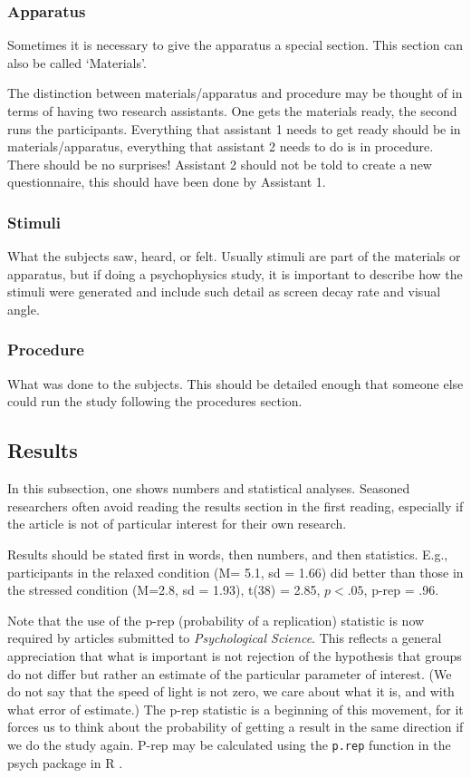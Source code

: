 \documentclass[doc]{apa}%
\let\proglang=\textsf
\newcommand{\R}{\proglang{R}}
\newcommand{\pkg}[1]{{\normalfont\fontseries{b}\selectfont #1}}
\newcommand{\fun}[1]{{\texttt{#1}}}
\begin{document}
\subsubsection{Apparatus}
Sometimes it is necessary to give the apparatus a special section.  This section can also be called `Materials'.

The distinction between materials/apparatus and procedure may be thought of in terms of having two research assistants.  One gets the materials ready, the second runs the participants.  Everything that assistant 1 needs to get ready should be in materials/apparatus, everything that assistant  2 needs to do is in procedure.  There should be no surprises!  Assistant 2 should not be told to create a new questionnaire, this should have been done by Assistant 1. %

\subsubsection{Stimuli}
What the subjects saw, heard, or felt. %
Usually stimuli are part of the materials or apparatus, but if doing a psychophysics study, it is important to describe how the stimuli were generated and include such detail as screen decay rate and visual angle.
\subsubsection{Procedure}
What was done to the subjects.  This should be detailed enough that someone else could run the study following the procedures section. 
\subsection{Results}
In this subsection, one shows numbers and statistical analyses. Seasoned researchers often avoid reading the results section in the first reading, especially if the article is not of particular interest for their own research. %

Results should be stated first in words, then numbers, and then statistics.  E.g., participants in the relaxed condition (M= 5.1, sd = 1.66) did better than those in the stressed condition (M=2.8, sd = 1.93), t(38) = 2.85, $p< .05$, p-rep = .96.



Note that the use of the p-rep (probability of a replication) statistic \cite{killeen} is now required by articles submitted to\emph{ Psychological Science}. This reflects a general appreciation that what is important is not rejection of the hypothesis that groups do not differ but rather an estimate of the particular parameter of interest.  (We do not say that the speed of light is not zero, we care about what it is, and with what error of estimate.)  The p-rep statistic is a beginning of this movement, for it forces us to think about the probability of getting a result in the same direction if we do the study again.  P-rep may be calculated using the \fun{p.rep} function in the \pkg{psych} package in \R{} \cite{R}. 
\end{document}
